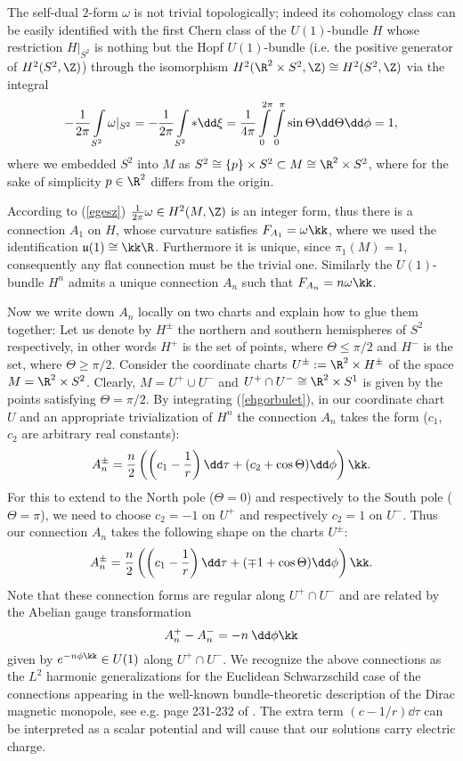 \documentclass[a4paper,12pt,draft]{article}
\begin{document}
The self-dual $2$-form $\omega$ is not trivial topologically; 
indeed its cohomology class can be easily identified with  the 
first Chern class of the $U(1)$-bundle $H$ whose
restriction $H\vert_{S^2}$ is nothing but the Hopf $U(1)$-bundle
(i.e. the positive generator of $H^2(S^2,\Z)$) through the 
isomorphism $H^2(\R^2\times S^2,\Z)\cong H^2(S^2,\Z)$ via the integral
\begin{eqnarray}-{1\over 2\pi}\int\limits_{S^2}\omega\vert_{S^2}=
-{1\over 2\pi}\int\limits_{S^2}*\dd\xi={1\over
4\pi}\int\limits_0^{2\pi}\int\limits_0^\pi\sin\Theta\dd\Theta\dd\phi = 1,
\label{egesz}\end{eqnarray} 
where we embedded $S^2$ into $M$ as $S^2\cong \{p\}\times S^2\subset 
M\cong \R^2\times S^2$, where for the sake  of simplicity $p\in \R^2$
differs from the origin. 

According to (\ref{egesz}) ${1\over 2\pi}\omega\in H^2(M,\Z)$ 
is an integer form, 
thus there is a connection $A_1$ on $H$, whose curvature
satisfies $F_{A_1}=\omega\kk$, where we used the identification 
${\mathfrak u}(1)\cong\kk\R$. Furthermore it is unique, since
$\pi_1(M)=1$, consequently any flat connection must be the trivial one. 
Similarly the $U(1)$-bundle $H^n$ admits a
unique connection $A_n$ such that $F_{A_n}=n\omega\kk$. 

Now we write down $A_n$ locally 
on two charts and explain how to glue them together: 
Let us denote by $H^\pm$ the northern and southern hemispheres of $S^2$
respectively, in other words $H^+$ is the set of points, where 
$\Theta\leq \pi/2$ and $H^-$ is the set, where $\Theta\geq \pi/2$. 
Consider the coordinate charts $U^\pm :=\R^2\times H^\pm$
of the space $M=\R^2\times S^2$. Clearly, $M=U^+\cup U^-$ and $U^+\cap
U^-\cong \R^2\times S^1$ is given by the points satisfying $\Theta =\pi
/2$.
 By integrating
(\ref{ehgorbulet}), in our coordinate
chart $U$ and an appropriate trivialization of $H^n$ the connection
$A_n$ takes the form ($c_1$, $c_2$ are arbitrary real constants): 
\begin{eqnarray*}A_n^\pm =\frac{n}{2}\left(\left( c_1-\frac{1}{r}\right)\dd\tau
+(c_2+\cos\Theta )\dd\phi\right)\kk.
\end{eqnarray*}
For this to extend to the North pole ($\Theta=0$) and respectively to the 
South pole ($\Theta=\pi$), we need to choose $c_2=-1$ on $U^+$ 
and respectively $c_2=1$ on $U^-$. Thus our connection $A_n$ takes the 
following shape on the charts $U^\pm$:
\begin{eqnarray}A_n^\pm =\frac{n}{2}\left(\left( c_1-\frac{1}{r}\right)\dd\tau
+(\mp 1+\cos\Theta )\dd\phi\right)\kk.
\label{local}
\end{eqnarray}
Note that these connection forms are regular along $U^+\cap U^-$ and are
related by the Abelian gauge transformation
\[A^+_n-A^-_n=-n\:\dd\phi\kk \]
given by $e^{-n\phi\kk}\in U(1)$ along $U^+\cap U^-$. We
recognize the above connections as the $L^2$ harmonic generalizations
for the Euclidean Schwarzschild case of the connections appearing in the
well-known bundle-theoretic description of the Dirac magnetic monopole,
see e.g. page 231-232 of \cite{egu-gyl-han}. The extra term
$(c-1/r)\dd\tau$ can be interpreted as a scalar potential and will cause
that our solutions carry electric charge.
\end{document}
